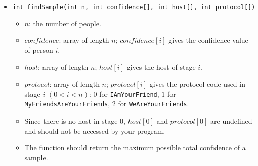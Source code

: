 \begin{itemize}
\item \texttt{int findSample(int n, int confidence[], int host[], int protocol[])}
\begin{itemize}
\item $n$: the number of people.
\item $confidence$: array of length $n$; $confidence[i]$ gives the confidence value of person $i$.
\item $host$: array of length $n$; $host[i]$ gives the host of stage $i$.
\item $protocol$: array of length $n$; $protocol[i]$ gives the protocol code used in stage $i$ $(0 < i < n)$: $0$ for \texttt{IAmYourFriend}, $1$ for \texttt{MyFriendsAreYourFriends}, $2$ for \texttt{WeAreYourFriends}.
\item Since there is no host in stage $0$, $host[0]$ and $protocol[0]$ are undefined and should not be accessed by your program.
\item The function should return the maximum possible total confidence of a sample.
\end{itemize}
\end{itemize}